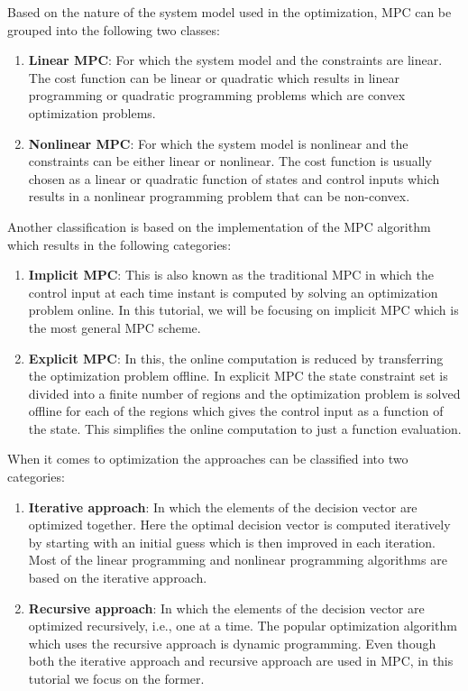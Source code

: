 \documentclass{article}
\begin{document}
\par Based on the nature of the system model used in the optimization, MPC can be grouped into the following two classes:
\begin{enumerate}
    \item \textbf{Linear MPC}: For which the system model and the constraints are linear. 
    The cost function can be linear or quadratic which results in linear programming or quadratic programming problems which are convex optimization problems.
    \item \textbf{Nonlinear MPC}: For which the system model is nonlinear and the constraints can be either linear or nonlinear. The cost function is usually chosen as a linear or quadratic function of states and control inputs which results in a nonlinear programming problem that can be non-convex.
\end{enumerate}
Another classification is based on the implementation of the MPC algorithm which results in the following categories:
\begin{enumerate}
    \item \textbf{Implicit MPC}: This is also known as the traditional MPC in which the control input at each time instant is computed by solving an optimization problem online. In this tutorial, we will be focusing on implicit MPC which is the most general MPC scheme.
    \item \textbf{Explicit MPC}: In this, the online computation is reduced by transferring the optimization problem offline. In explicit MPC the state constraint set is divided into a finite number of regions and the optimization problem is solved offline for each of the regions which gives the control input as a function of the state. This simplifies the online computation to just a function evaluation.
\end{enumerate}
\par When it comes to optimization the approaches can be classified into two categories:
\begin{enumerate}
    \item \textbf{Iterative approach}: In which the elements of the decision vector are optimized together. Here the optimal decision vector is computed iteratively by starting with an initial guess which is then improved in each iteration. Most of the linear programming and nonlinear programming algorithms are based on the iterative approach. 
    \item \textbf{Recursive approach}: In which the elements of the decision vector are optimized recursively, i.e., one at a time. The popular optimization algorithm which uses the recursive approach is dynamic programming. Even though both the iterative approach and recursive approach are used in MPC, in this tutorial we focus on the former.
\end{enumerate}
 \newpage
\end{document}
